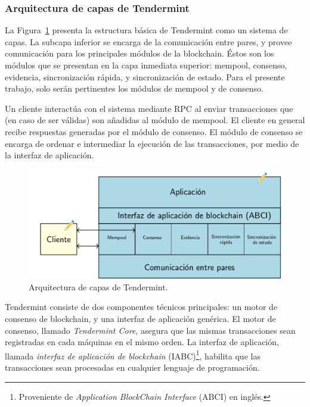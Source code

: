 \subsubsection{Arquitectura de capas de Tendermint}\label{subsec:layers}

La Figura~\ref{fig:tendermint-architecture} presenta la estructura básica de Tendermint como un sistema de capas.
La subcapa inferior se encarga de la comunicación entre pares, y provee comunicación para los principales
módulos de la blockchain. Éstos son los módulos que se presentan en la capa inmediata superior: mempool, consenso,
evidencia, sincronización rápida, y sincronización de estado. Para el presente trabajo, solo serán pertinentes los
módulos de mempool y de consenso.

Un cliente interactúa con el sistema mediante RPC al enviar transacciones
que (en caso de ser válidas) son añadidas al módulo de mempool. El cliente en general
recibe respuestas generadas por el módulo de consenso.
El módulo de consenso se encarga de ordenar e intermediar la ejecución de las transacciones, por medio de la
interfaz de aplicación.

\begin{figure}
  \centering
  \includegraphics[scale=0.2]{figures/tendermint-layers.png}
  \caption{Arquitectura de capas de Tendermint.}
  \label{fig:tendermint-architecture}
\end{figure}

Tendermint consiste de dos componentes técnicos principales: un motor de consenso de blockchain, y una interfaz
de aplicación genérica.
%
El motor de consenso, llamado \textit{Tendermint Core}, asegura que las mismas transacciones sean registradas en cada
máquinas en el mismo orden.
%
La interfaz de aplicación, llamada \textit{interfaz de aplicación de blockchain} (IABC)\footnote{Proveniente de \textit{Application
BlockChain Interface} (ABCI) en inglés.}, habilita que las transacciones
sean procesadas en cualquier lenguaje de programación.

